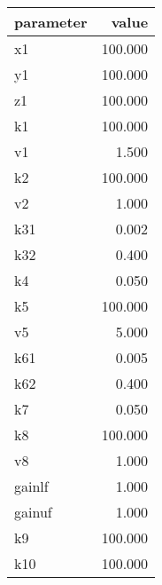 \documentclass[10pt,a4paper]{article}
\begin{document}
\begin{table}[ht]
\centering
\begin{tabular}{lr}
  \hline
parameter & value \\ 
  \hline
x1 & 100.000 \\ 
  y1 & 100.000 \\ 
  z1 & 100.000 \\ 
  k1 & 100.000 \\ 
  v1 & 1.500 \\ 
  k2 & 100.000 \\ 
  v2 & 1.000 \\ 
  k31 & 0.002 \\ 
  k32 & 0.400 \\ 
  k4 & 0.050 \\ 
  k5 & 100.000 \\ 
  v5 & 5.000 \\ 
  k61 & 0.005 \\ 
  k62 & 0.400 \\ 
  k7 & 0.050 \\ 
  k8 & 100.000 \\ 
  v8 & 1.000 \\ 
  gainlf & 1.000 \\ 
  gainuf & 1.000 \\ 
  k9 & 100.000 \\ 
  k10 & 100.000 \\ 
   \hline
\end{tabular}
\end{table}
 
\end{document}
